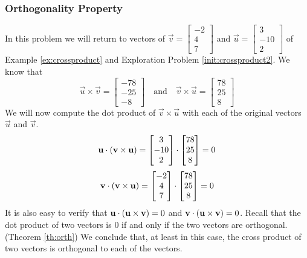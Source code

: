 \documentclass{ximera}
\begin{document}
\subsubsection*{Orthogonality Property}
\begin{exploration}\label{init:orthofcorssproduct}
In this problem we will return to vectors of $\vec{v}=\begin{bmatrix}-2\\ 4\\ 7\end{bmatrix}$ and $\vec{u}=\begin{bmatrix}3\\ -10\\ 2\end{bmatrix}$ of Example \ref{ex:crossproduct} and Exploration Problem \ref{init:crossproduct2}.  We know that 
$$\vec{u}\times\vec{v}=\begin{bmatrix}-78\\-25\\-8\end{bmatrix}\quad\text{and}\quad\vec{v}\times\vec{u}=\begin{bmatrix}78\\25\\8\end{bmatrix}$$
We will now compute the dot product of $\vec{v}\times\vec{u}$ with each of the original vectors $\vec{u}$ and $\vec{v}$.
$$\mathbf{u}\cdot(\mathbf{v}\times\mathbf{u})=\begin{bmatrix}3\\ -10\\ 2\end{bmatrix}\cdot\begin{bmatrix}78\\25\\8\end{bmatrix}=0$$
$$\mathbf{v}\cdot(\mathbf{v}\times\mathbf{u})=\begin{bmatrix}-2\\ 4\\ 7\end{bmatrix}\cdot\begin{bmatrix}78\\25\\8\end{bmatrix}=0$$
It is also easy to verify that $\mathbf{u}\cdot(\mathbf{u}\times\mathbf{v})=0$ and $\mathbf{v}\cdot(\mathbf{u}\times\mathbf{v})=0$.  Recall that the dot product of two vectors is $0$ if and only if the two vectors are orthogonal. (Theorem \ref{th:orth})
We conclude that, at least in this case, the cross product of two vectors is orthogonal to each of the vectors.  

\end{exploration}
\end{document}
